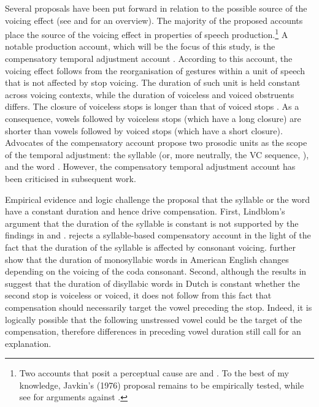 \documentclass[12pt,]{article}
\let\rmarkdownfootnote\footnote%
\def\footnote{\protect\rmarkdownfootnote}
\begin{document}
Several proposals have been put forward in relation to the possible
source of the voicing effect (see \citealt{soskuthy2013} and
\citealt{begus2017} for an overview). The majority of the proposed
accounts place the source of the voicing effect in properties of speech
production.\footnote{Two accounts that posit a perceptual cause are \citet{javkin1976} and \citet{kluender1988}. To the best of my knowledge, Javkin's (1976) proposal remains to be empirically tested, while see \citet{fowler1992} for arguments against \citet{kluender1988}.}
A notable production account, which will be the focus of this study, is
the compensatory temporal adjustment account
\citep{lindblom1967, slis1969a, slis1969, lehiste1970, lehiste1970a}.
According to this account, the voicing effect follows from the
reorganisation of gestures within a unit of speech that is not affected
by stop voicing. The duration of such unit is held constant across
voicing contexts, while the duration of voiceless and voiced obstruents
differs. The closure of voiceless stops is longer than that of voiced
stops \citep{lisker1957, van-summers1987, davis1989, de-jong1991}. As a
consequence, vowels followed by voiceless stops (which have a long
closure) are shorter than vowels followed by voiced stops (which have a
short closure). Advocates of the compensatory account propose two
prosodic units as the scope of the temporal adjustment: the syllable
(or, more neutrally, the VC sequence, \citealt{lindblom1967}), and the
word \citep{slis1969a, slis1969, lehiste1970, lehiste1970a}. However,
the compensatory temporal adjustment account has been criticised in
subsequent work.

Empirical evidence and logic challenge the proposal that the syllable or
the word have a constant duration and hence drive compensation. First,
Lindblom's \citeyear{lindblom1967} argument that the duration of the
syllable is constant is not supported by the findings in
\citet{chen1970} and \citet{jacewicz2009}. \citet{chen1970} rejects a
syllable-based compensatory account in the light of the fact that the
duration of the syllable is affected by consonant voicing.
\citet{jacewicz2009} further show that the duration of monosyllabic
words in American English changes depending on the voicing of the coda
consonant. Second, although the results in \citet{slis1969} suggest that
the duration of disyllabic words in Dutch is constant whether the second
stop is voiceless or voiced, it does not follow from this fact that
compensation should necessarily target the vowel preceding the stop.
Indeed, it is logically possible that the following unstressed vowel
could be the target of the compensation, therefore differences in
preceding vowel duration still call for an explanation.
\end{document}
